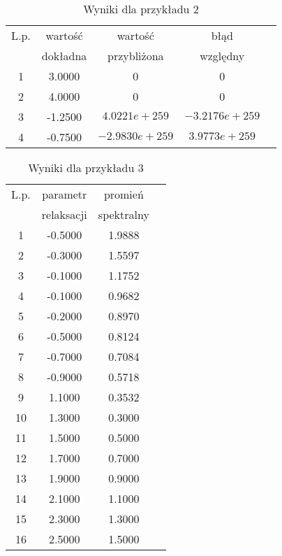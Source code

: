 \documentclass[12pt]{article}
\begin{document}
\begin{table}[H]
\caption{\footnotesize Wyniki dla przykładu 2} %
\renewcommand{\arraystretch}{1.1}
\centering\begin{tabular}{|c|c|c|c|c|}
\hline L.p. & wartość & wartość & błąd\\
 & dokładna & przybliżona & względny\\
\hline 1 & 3.0000 & 0 & 0\\
\hline 2 & 4.0000 & 0 & 0\\
\hline 3 & -1.2500 & $4.0221e\!+\!259$ & $-3.2176e\!+\!259$\\
\hline 4 & -0.7500 & $-2.9830e\!+\!259$ & $3.9773e\!+\!259$\\
\end{tabular}
\end{table}

\begin{table}[H]
\caption{\footnotesize Wyniki dla przykładu 3} %
\renewcommand{\arraystretch}{1.1}
\centering\begin{tabular}{|c|c|c|c|}
\hline L.p. & parametr & promień\\
 & relaksacji & spektralny\\
\hline 1 & -0.5000 & 1.9888\\
\hline 2 & -0.3000 & 1.5597\\
\hline 3 & -0.1000 & 1.1752\\
\hline 4 & -0.1000 & 0.9682\\
\hline 5 & -0.2000 & 0.8970\\
\hline 6 & -0.5000 & 0.8124\\
\hline 7 & -0.7000 & 0.7084\\
\hline 8 & -0.9000 & 0.5718\\
\hline 9 & 1.1000 & 0.3532\\
\hline 10 & 1.3000 & 0.3000\\
\hline 11 & 1.5000 & 0.5000\\
\hline 12 & 1.7000 & 0.7000\\
\hline 13 & 1.9000 & 0.9000\\
\hline 14 & 2.1000 & 1.1000\\
\hline 15 & 2.3000 & 1.3000\\
\hline 16 & 2.5000 & 1.5000\\
\end{tabular}
\end{table}
\end{document}
